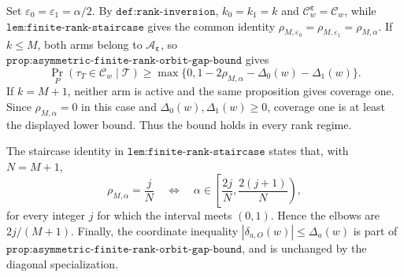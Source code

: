 Set \(\varepsilon_0=\varepsilon_1=\alpha/2\). By \(\texttt{def:rank-inversion}\), \(k_0=k_1=k\) and \(\mathcal C^{\boldsymbol\varepsilon}_w=\mathcal C_w\), while \(\texttt{lem:finite-rank-staircase}\) gives the common identity \(\rho_{M,\varepsilon_0}=\rho_{M,\varepsilon_1}=\rho_{M,\alpha}\). If \(k\le M\), both arms belong to \(\mathcal A_{\boldsymbol\varepsilon}\), so \(\texttt{prop:asymmetric-finite-rank-orbit-gap-bound}\) gives
\[
\Pr_P(\tau_T\in\mathcal C_w\mid\mathcal T)\ge\max\{0,1-2\rho_{M,\alpha}-\Delta_0(w)-\Delta_1(w)\}.
\]
If \(k=M+1\), neither arm is active and the same proposition gives coverage one. Since \(\rho_{M,\alpha}=0\) in this case and \(\Delta_0(w),\Delta_1(w)\ge0\), coverage one is at least the displayed lower bound. Thus the bound holds in every rank regime.

The staircase identity in \(\texttt{lem:finite-rank-staircase}\) states that, with \(N=M+1\),
\[
\rho_{M,\alpha}=\frac{j}{N}
\quad\Longleftrightarrow\quad
\alpha\in\left[\frac{2j}{N},\frac{2(j+1)}{N}\right),
\]
for every integer \(j\) for which the interval meets \((0,1)\). Hence the elbows are \(2j/(M+1)\). Finally, the coordinate inequality \(|\delta_{a,O}(w)|\le\Delta_a(w)\) is part of \(\texttt{prop:asymmetric-finite-rank-orbit-gap-bound}\), and is unchanged by the diagonal specialization.